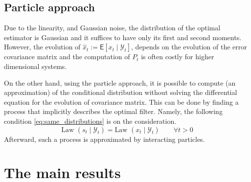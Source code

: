 \documentclass[12pt]{llncs}
\begin{document}
\subsection{Particle approach}

Due to the linearity, and Gaussian noise, the distribution of the optimal estimator is Gaussian and it suffices to have only its first and second moments. However, the evolution of $\widehat x_t := \mathsf{E}[x_t \mid \mathcal{Y}_t]$, depends on the evolution of the error covariance matrix %
and the computation of $P_t$ is often costly for higher dimensional systems.



On the other hand, using the particle approach, it is possible to compute (an approximation) of 
the conditional distribution without solving the differential equation for the evolution of covariance matrix.
 This can be done by finding a process  that implicitly describes the optimal filter. Namely, the following condition \eqref{eq:same_distributions} is on the consideration.
 \begin{equation}
    \label{eq:same_distributions}
    \text{Law }(s_t\mid \mathcal{Y}_t) = \text{Law }(x_t \mid \mathcal{Y}_t)    \qquad \forall t>0
    \end{equation}
Afterward, such a process is approximated by interacting particles.



\section{The main results} %
\end{document}
